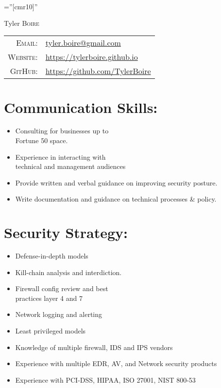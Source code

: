 \documentclass[a4paper,10pt]{article}
\begin{document}
\pagestyle{empty} 		%

\font\fb=''[cmr10]'' 	%

{\Huge Tyler \textsc{Boire}}


\begin{tabular}{rl}
    \textsc{Email:}   & \href{mailto:tyler.boire@gmail.com}{tyler.boire@gmail.com}\\
    \textsc{Website:} & \href{https://tylerboire.github.io}{https://tylerboire.github.io}\\
    \textsc{GitHub:}  & \href{https://github.com/TylerBoire}{https://github.com/TylerBoire}
\end{tabular}



\begin{multicols}{2}

\section{Communication Skills:}

\begin{itemize}[leftmargin=*]
    \item Consulting for businesses up to \\ Fortune 50 space. 
    \item Experience in interacting with \\ technical and management audiences
    \item Provide written and verbal guidance on improving security posture.
    \item Write documentation and guidance on technical processes \& policy. 
\end{itemize}

\section{Security Strategy: }
\begin{itemize}[leftmargin=*]
    \item Defense-in-depth models
    \item Kill-chain analysis and interdiction. 
    \item Firewall config review and best \\ practices layer 4 and 7
    \item Network logging and alerting
    \item Least privileged models
    \item Knowledge of multiple firewall, IDS and IPS vendors
    \item Experience with multiple EDR, AV, and Network security products
    \item Experience with PCI-DSS, HIPAA, ISO 27001, NIST 800-53
\end{itemize}


\end{multicols}
\end{document}
